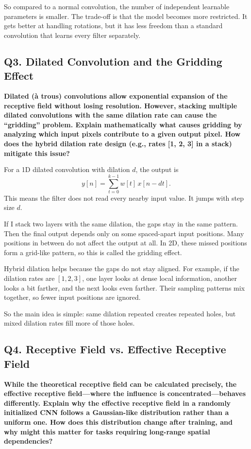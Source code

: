 \documentclass[12pt,a4paper]{article}
\newcommand{\qtext}[1]{\noindent\textbf{#1}\par}
\newcommand{\ansstart}{\begingroup\color{answerblue}}
\newcommand{\ansend}{\endgroup}
\begin{document}
So compared to a normal convolution, the number of independent learnable parameters is smaller. The trade-off is that the model becomes more restricted. It gets better at handling rotations, but it has less freedom than a standard convolution that learns every filter separately.
\ansend

\clearpage

\subsection{Q3. Dilated Convolution and the Gridding Effect}

\qtext{Dilated (\`a trous) convolutions allow exponential expansion of the receptive field without losing resolution. However, stacking multiple dilated convolutions with the same dilation rate can cause the ``gridding'' problem. Explain mathematically what causes gridding by analyzing which input pixels contribute to a given output pixel. How does the hybrid dilation rate design (e.g., rates [1, 2, 3] in a stack) mitigate this issue?}

\ansstart
For a 1D dilated convolution with dilation \(d\), the output is
\[
y[n] = \sum_{t=0}^{k-1} w[t]\,x[n-dt].
\]
This means the filter does not read every nearby input value. It jumps with step size \(d\).

If I stack two layers with the same dilation, the gaps stay in the same pattern. Then the final output depends only on some spaced-apart input positions. Many positions in between do not affect the output at all. In 2D, these missed positions form a grid-like pattern, so this is called the gridding effect.

Hybrid dilation helps because the gaps do not stay aligned. For example, if the dilation rates are \([1,2,3]\), one layer looks at dense local information, another looks a bit farther, and the next looks even farther. Their sampling patterns mix together, so fewer input positions are ignored.

So the main idea is simple: same dilation repeated creates repeated holes, but mixed dilation rates fill more of those holes.
\ansend

\clearpage

\subsection{Q4. Receptive Field vs. Effective Receptive Field}

\qtext{While the theoretical receptive field can be calculated precisely, the effective receptive field---where the influence is concentrated---behaves differently. Explain why the effective receptive field in a randomly initialized CNN follows a Gaussian-like distribution rather than a uniform one. How does this distribution change after training, and why might this matter for tasks requiring long-range spatial dependencies?}
\end{document}
